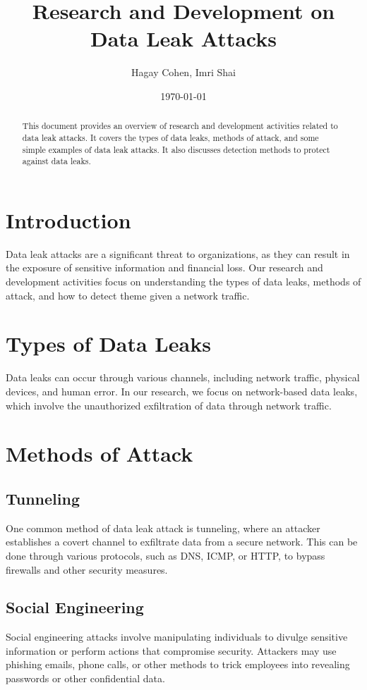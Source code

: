 \documentclass{article}
\title{Research and Development on Data Leak Attacks}
\author{Hagay Cohen, Imri Shai}
\date{\today}
\begin{document}
\maketitle

\begin{abstract}
This document provides an overview of research and development activities related to data leak attacks. It covers the types of data leaks, methods of attack, and some simple examples of data leak attacks. It also discusses detection methods to protect against data leaks.
\end{abstract}

\section{Introduction}
Data leak attacks are a significant threat to organizations, as they can result in the exposure of sensitive information and financial loss. Our research and development activities focus on understanding the types of data leaks, methods of attack, and how to detect theme given a network traffic. 

\section{Types of Data Leaks}
Data leaks can occur through various channels, including network traffic, physical devices, and human error. In our research, we focus on network-based data leaks, which involve the unauthorized exfiltration of data through network traffic.

\section{Methods of Attack}

\subsection{Tunneling}
One common method of data leak attack is tunneling, where an attacker establishes a covert channel to exfiltrate data from a secure network. This can be done through various protocols, such as DNS, ICMP, or HTTP, to bypass firewalls and other security measures.

\subsection{Social Engineering}
Social engineering attacks involve manipulating individuals to divulge sensitive information or perform actions that compromise security. Attackers may use phishing emails, phone calls, or other methods to trick employees into revealing passwords or other confidential data.
\end{document}
